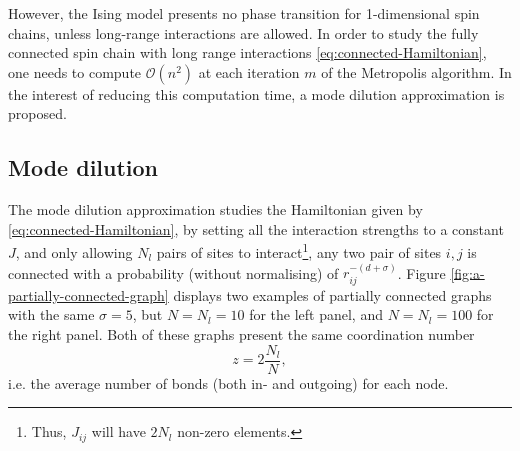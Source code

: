However, the Ising model presents no phase transition \cite{ising1925beitrag} for 1-dimensional spin chains, unless long-range interactions are allowed. In order to study the fully connected spin chain with long range interactions \eqref{eq:connected-Hamiltonian}, one needs to compute $\mathcal{O}(n^2)  $ at each iteration $m$ of the Metropolis algorithm. In the interest of reducing this computation time, a mode dilution approximation is proposed.

\subsection{Mode dilution}%
\label{sub:Mode dilution}

The mode dilution approximation studies the Hamiltonian given by \eqref{eq:connected-Hamiltonian}, by setting all the interaction strengths to a constant $J$, and only allowing $N_l$ pairs of sites to interact\footnote{Thus, $J_{ij}$ will have $2N_l$ non-zero elements.}, any two pair of sites ${ i, j } $ is connected with a probability (without normalising) of $r_{ij}^{-(d+\sigma)}$. Figure \ref{fig:a-partially-connected-graph} displays two examples of partially connected graphs with the same $\sigma= 5$, but $N=N_l=10$ for the left panel, and  $N = N_l = 100$ for the  right panel. Both of these graphs present the same coordination number $$z = 2 \frac{N_l}{N},$$ i.e. the average number of bonds (both in- and outgoing) for each node.


